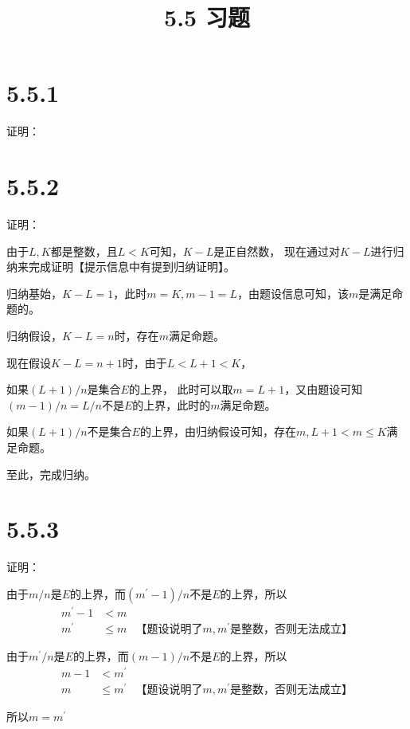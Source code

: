 \documentclass{article}
\theoremstyle{mystyle}
\begin{document}
\title{5.5 习题}
\maketitle

\section*{5.5.1}

证明：

\section*{5.5.2}

证明：

由于$L,K$都是整数，且$L < K$可知，$K - L$是正自然数，
现在通过对$K - L$进行归纳来完成证明【提示信息中有提到归纳证明】。

归纳基始，$K-L=1$，此时$m=K,m-1=L$，由题设信息可知，该$m$是满足命题的。

归纳假设，$K-L=n$时，存在$m$满足命题。

现在假设$K-L=n+1$时，由于$L < L + 1 < K$，

如果$(L + 1)/n$是集合$E$的上界，
此时可以取$m=L+1$，又由题设可知$(m-1)/n=L/n$不是$E$的上界，此时的$m$满足命题。

如果$(L + 1)/n$不是集合$E$的上界，由归纳假设可知，存在$m, L+1 < m \leq K$满足命题。

至此，完成归纳。

\section*{5.5.3}

证明：

由于$m/n$是$E$的上界，而$(m^\prime -1)/n$不是$E$的上界，所以
\begin{align*}
  m^\prime -1 & < m                                          \\
  m^\prime    & \leq m & \text{【题设说明了$m,m^\prime$是整数，否则无法成立】}
\end{align*}

由于$m^\prime/n$是$E$的上界，而$(m -1)/n$不是$E$的上界，所以
\begin{align*}
  m - 1 & < m^\prime                                          \\
  m     & \leq m^\prime & \text{【题设说明了$m,m^\prime$是整数，否则无法成立】}
\end{align*}

所以$m = m^\prime$
\end{document}
